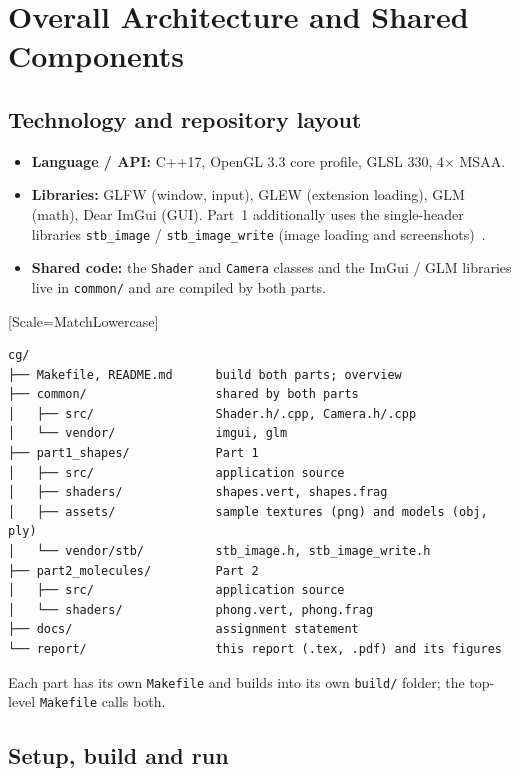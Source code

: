 \documentclass[a4paper, 11pt]{article}
\newcommand{\code}[1]{\texttt{#1}}
\begin{document}
\section{Overall Architecture and Shared Components}\label{sec:overall}

\subsection{Technology and repository layout}

\begin{itemize}
  \item \textbf{Language / API:} C++17, OpenGL 3.3 core profile, GLSL 330, 4$\times$ MSAA.
  \item \textbf{Libraries:} GLFW (window, input), GLEW (extension loading), GLM (math), Dear ImGui (GUI). Part~1 additionally uses the single-header libraries
        \code{stb\_image} / \code{stb\_image\_write} (image loading and screenshots)~\cite{stb}.
  \item \textbf{Shared code:} the \code{Shader} and \code{Camera} classes and the ImGui / GLM libraries live in \code{common/} and are compiled by both parts.
\end{itemize}

{\setmonofont{DejaVu Sans Mono}[Scale=MatchLowercase]\small
\begin{verbatim}
cg/
├── Makefile, README.md      build both parts; overview
├── common/                  shared by both parts
│   ├── src/                 Shader.h/.cpp, Camera.h/.cpp
│   └── vendor/              imgui, glm
├── part1_shapes/            Part 1
│   ├── src/                 application source
│   ├── shaders/             shapes.vert, shapes.frag
│   ├── assets/              sample textures (png) and models (obj, ply)
│   └── vendor/stb/          stb_image.h, stb_image_write.h
├── part2_molecules/         Part 2
│   ├── src/                 application source
│   └── shaders/             phong.vert, phong.frag
├── docs/                    assignment statement
└── report/                  this report (.tex, .pdf) and its figures
\end{verbatim}}

Each part has its own \code{Makefile} and builds into its own \code{build/} folder; the top-level \code{Makefile} calls both.

\subsection{Setup, build and run}\label{sec:build}
\end{document}
